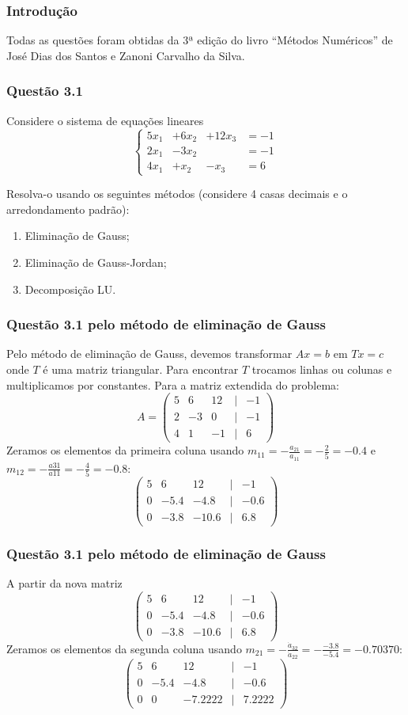 
\begin{frame}
\frametitle{Introdução}
Todas as questões foram obtidas da 3ª edição do livro ``Métodos Numéricos'' de
José Dias dos Santos e Zanoni Carvalho da Silva.
\end{frame}

\begin{frame}
\frametitle{Questão 3.1}
Considere o sistema de equações lineares
\[\left\{
\begin{array}{llll}
5x_1 &+ 6x_2 &+ 12x_3 &= -1 \\
2x_1 &- 3x_2 &&= -1\\
4x_1 &+x_2 &-x_3 &= 6
\end{array}
\right.\]

Resolva-o usando os seguintes métodos (considere 4 casas decimais e o arredondamento padrão):
\begin{enumerate}
  \item Eliminação de Gauss;
  \item Eliminação de Gauss-Jordan;
  \item Decomposição LU.
\end{enumerate}
\end{frame}

\begin{frame}
\frametitle{Questão 3.1 pelo método de eliminação de Gauss}
\small
Pelo método de eliminação de Gauss, devemos transformar $Ax = b$ em $T x = c$ onde $T$ é uma matriz triangular.
%
Para encontrar $T$ trocamos linhas ou colunas e multiplicamos por constantes.
%
Para a matriz extendida do problema:
\[A = 
\begin{pmatrix}
5 & 6 & 12 & | & -1\\
2 & -3 & 0 & | & -1\\
4 & 1 & -1 & | & 6 
\end{pmatrix}
\]
Zeramos os elementos da primeira coluna usando
$m_{11} = -\frac{a_{21}}{a_{11}} = - \frac{2}{5} = -0.4$ e $m_{12}=-\frac{a31}{a11} = -\frac{4}{5}=-0.8$:
\[
\begin{pmatrix}
5 & 6 & 12 & | & -1\\
0 & -5.4 & -4.8 & | & -0.6\\
0 & -3.8 & -10.6 & | & 6.8 
\end{pmatrix}
\]
\end{frame}

\begin{frame}
\frametitle{Questão 3.1 pelo método de eliminação de Gauss}
\small
A partir da nova matriz
\[
\begin{pmatrix}
5 & 6 & 12 & | & -1\\
0 & -5.4 & -4.8 & | & -0.6\\
0 & -3.8 & -10.6 & | & 6.8 
\end{pmatrix}
\]
Zeramos os elementos da segunda coluna usando $m_{21} = -\frac{\dot{a}_{32}}{\dot{a}_{22}} = -\frac{-3.8}{-5.4}=-0.70370$:
\[
\begin{pmatrix}
5 & 6 & 12 & | & -1\\
0 & -5.4 & -4.8 & | & -0.6\\
0 & 0 & -7.2222 & | & 7.2222 
\end{pmatrix}
\]
\end{frame}

